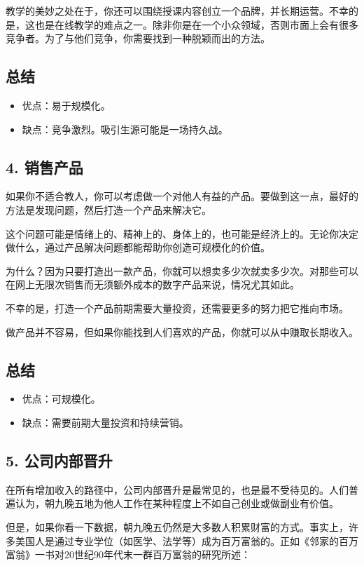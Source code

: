 教学的美妙之处在于，你还可以围绕授课内容创立一个品牌，并长期运营。不幸的是，这也是在线教学的难点之一。除非你是在一个小众领域，否则市面上会有很多竞争者。为了与他们竞争，你需要找到一种脱颖而出的方法。

\subsection{总结}
\begin{itemize}
\item 优点：易于规模化。
\item 缺点：竞争激烈。吸引生源可能是一场持久战。
\end{itemize}
\subsection{4. 销售产品}
如果你不适合教人，你可以考虑做一个对他人有益的产品。要做到这一点，最好的方法是发现问题，然后打造一个产品来解决它。

这个问题可能是情绪上的、精神上的、身体上的，也可能是经济上的。无论你决定做什么，通过产品解决问题都能帮助你创造可规模化的价值。

为什么？因为只要打造出一款产品，你就可以想卖多少次就卖多少次。对那些可以在网上无限次销售而无须额外成本的数字产品来说，情况尤其如此。

不幸的是，打造一个产品前期需要大量投资，还需要更多的努力把它推向市场。

做产品并不容易，但如果你能找到人们喜欢的产品，你就可以从中赚取长期收入。

\subsection{总结}
\begin{itemize}
\item 优点：可规模化。
\item 缺点：需要前期大量投资和持续营销。
\end{itemize}
\subsection{5. 公司内部晋升}
在所有增加收入的路径中，公司内部晋升是最常见的，也是最不受待见的。人们普遍认为，朝九晚五地为他人工作在某种程度上不如自己创业或做副业有价值。

但是，如果你看一下数据，朝九晚五仍然是大多数人积累财富的方式。事实上，许多美国人是通过专业学位（如医学、法学等）成为百万富翁的。正如《邻家的百万富翁》一书对20世纪90年代末一群百万富翁的研究所述：

